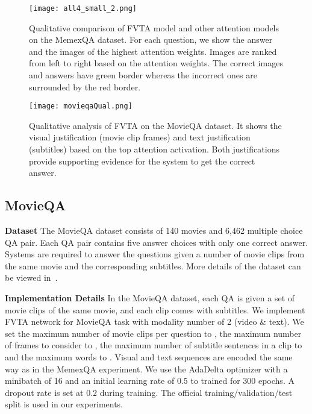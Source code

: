 \begin{figure*}[!t]
	\centering
		\texttt{[image: all4\_small\_2.png]}
	\caption{ 
	Qualitative comparison of FVTA model and other attention models on the MemexQA dataset. For each question, we show the answer and the images of the highest attention weights. Images are ranked from left to right based on the attention weights. The correct images and answers have green border whereas the incorrect ones are surrounded by the red border. }
	\label{FVT_comp_vis}
\end{figure*}

\begin{figure*}[!t]
	\centering
		\texttt{[image: movieqaQual.png]}
	\caption{ 
	Qualitative analysis of FVTA on the MovieQA dataset. It shows the visual justification (movie clip frames) and text justification (subtitles) based on the top attention activation. Both justifications provide supporting evidence for the system to get the correct answer.
	}
	\label{FVT_comp_movieqa_vis}
\end{figure*}

\subsection{MovieQA}
\noindent\textbf{Dataset}
The MovieQA dataset consists of 140 movies and 6,462 multiple choice QA pair. Each QA pair contains five answer choices with only one correct answer. Systems are required to answer the questions given a number of movie clips from the same movie and the corresponding subtitles. 
More details of the dataset can be viewed in~\cite{tapaswi2016movieqa}.


\noindent\textbf{Implementation Details}
\label{sec-impl2}
In the MovieQA dataset, each QA is given a set of  movie clips of the same movie, and each clip comes with subtitles. We implement FVTA network for MovieQA task with modality number of 2 (video \& text). 
We set the maximum number of movie clips per question to , the maximum number of frames to consider to , the maximum number of subtitle sentences in a clip to  and the maximum words to . Visual and text sequences are encoded the same way as in the MemexQA \cite{jiang2017memexqa} experiment.  
We use the AdaDelta \cite{zeiler2012adadelta} optimizer with a minibatch of 16 and an initial learning rate of 0.5 to trained for 300 epochs. A dropout rate is set at 0.2 during training. 
The official training/validation/test split is used in our experiments.



